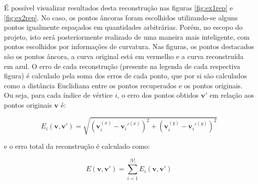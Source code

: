 É possível visualizar resultados desta reconstrução nas figuras \ref{fig:ex1rep} e \ref{fig:ex2rep}. No caso, os pontos âncoras foram escolhidos utilizando-se alguns pontos igualmente espaçados em quantidades arbitrárias. Porém, no escopo do projeto, isto será posteriormente realizado de uma maneira mais inteligente, com pontos escolhidos por informações de curvatura. Nas figuras, os pontos destacados são os pontos âncora, a curva original está em vermelho e a curva reconstruída em azul. O erro de cada reconstrução (presente na legenda de cada respectiva figura) é calculado pela soma dos erros de cada ponto, que por si são calculados como a distância Euclidiana entre os pontos recuperados e os pontos originais. Ou seja, para cada índice de vértice $i$, o erro dos pontos obtidos $\mathbf{v'}$ em relação aos pontos originais $\mathbf{v}$ é:

$$E_i(\mathbf{v, v'}) = \sqrt{(\mathbf v_i^{(x)} - \mathbf v_i'^{(x)})^2 + (\mathbf v_i^{(y)} - \mathbf v_i'^{(y)})^2}$$

\noindent e o erro total da reconstrução é calculado como:

$$E(\mathbf{v, v'}) = \sum_{i = 1}^{|V|}E_i(\mathbf{v, v'})$$

